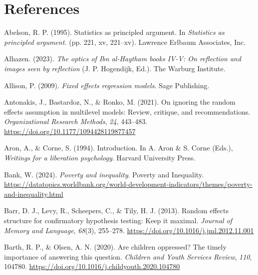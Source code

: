 \documentclass[
  letterpaper,
  DIV=11,
  numbers=noendperiod]{scrreprt}
\newlength{\cslhangindent}
\newenvironment{CSLReferences}[2] %
 {\begin{list}{}{%
  \setlength{\itemindent}{0pt}
  \setlength{\leftmargin}{0pt}
  \setlength{\parsep}{0pt}
  \ifodd #1
   \setlength{\leftmargin}{\cslhangindent}
   \setlength{\itemindent}{-1\cslhangindent}
  \fi
  \setlength{\itemsep}{#2\baselineskip}}}
 {\end{list}}
\begin{document}

\chapter*{References}\label{references}


\label{refs}
\begin{CSLReferences}{1}{0}
Abelson, R. P. (1995). Statistics as principled argument. In
\emph{Statistics as principled argument.} (pp. 221, xv, 221--xv).
Lawrence Erlbaum Associates, Inc.

Alhazen. (2023). \emph{The optics of {I}bn al-{H}aytham books {IV-V}: On
reflection and images seen by reflection} (J. P. Hogendijk, Ed.). The
Warburg Institute.

Allison, P. (2009). \emph{Fixed effects regression models}. Sage
Publishing.

Antonakis, J., Bastardoz, N., \& Ronko, M. (2021). On ignoring the
random effects assumption in multilevel models: Review, critique, and
recommendations. \emph{Organizational Research Methods}, \emph{24},
443--483. \url{https://doi.org/10.1177/1094428119877457}

Aron, A., \& Corne, S. (1994). Introduction. In A. Aron \& S. Corne
(Eds.), \emph{Writings for a liberation psychology}. Harvard University
Press.

Bank, W. (2024). \emph{Poverty and inequality}. Poverty and Inequality.
\url{https://datatopics.worldbank.org/world-development-indicators/themes/poverty-and-inequality.html}

Barr, D. J., Levy, R., Scheepers, C., \& Tily, H. J. (2013). Random
effects structure for confirmatory hypothesis testing: Keep it maximal.
\emph{Journal of Memory and Language}, \emph{68}(3), 255--278.
\url{https://doi.org/10.1016/j.jml.2012.11.001}

Barth, R. P., \& Olsen, A. N. (2020). Are children oppressed? The timely
importance of answering this question. \emph{Children and Youth Services
Review}, \emph{110}, 104780.
\url{https://doi.org/10.1016/j.childyouth.2020.104780}


\end{CSLReferences}
\end{document}
